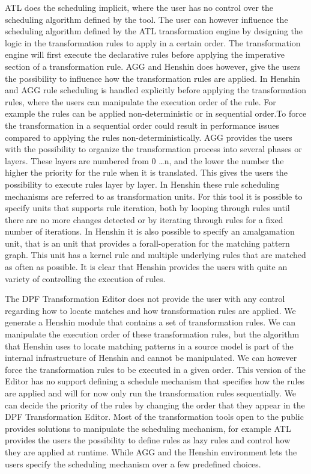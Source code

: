 ATL does the scheduling implicit, where the user has no control over the
scheduling algorithm defined by the tool. The user can however influence the scheduling
algorithm defined by the ATL transformation engine by designing the logic in the
transformation rules to apply in a certain order. The transformation
engine will first execute the declarative rules before applying the imperative
section of a transformation rule. AGG and Henshin does however, give the
users the possibility to influence how the transformation rules are applied. 
In Henshin and AGG rule scheduling is handled explicitly before applying the
transformation rules, where the users can manipulate the execution order of the
rule.
For example the rules can be applied non-deterministic or in sequential order.To
force the transformation in a sequential order could result in performance
issues compared to applying the rules non-deterministically. AGG provides the
users with the possibility to organize the transformation process into several
phases or layers. These layers are numbered from 0 \ldots n, and the lower the
number the higher the priority for the rule when it is translated. This gives
the users the possibility to execute rules layer by layer. In Henshin these
rule scheduling mechanisms are referred to as transformation units. For this
tool it is possible to specify units that supports rule iteration, both by
looping through rules until there are no more changes detected or by iterating
through rules for a fixed number of iterations. In Henshin it is also possible
to specify an amalgamation unit, that is an unit that provides a
forall-operation for the matching pattern graph. This unit has a kernel rule
and multiple underlying rules that are matched as often as possible. It is
clear that Henshin provides the users with quite an variety of controlling the
execution of rules.

The DPF Transformation Editor does not provide the user with any control
regarding how to locate matches and how transformation rules are applied. We generate a
Henshin module that contains a set of transformation rules. We can manipulate
the execution order of these transformation rules, but the algorithm that
Henshin uses to locate matching patterns in a source model is part of the
internal infrastructure of Henshin and cannot be manipulated. We can however
force the transformation rules to be executed in a given order. This version of
the Editor has no support defining a schedule mechanism that specifies how the
rules are applied and will for now only run the transformation rules
sequentially. We can decide the priority of the rules by changing the order
that they appear in the DPF Transformation Editor. Most of the transformation
tools open to the public provides solutions to manipulate the scheduling
mechanism, for example ATL provides the users the possibility to define rules
as lazy rules and control how they are applied at runtime. While AGG and the
Henshin environment lets the users specify the scheduling mechanism over a few
predefined choices.

